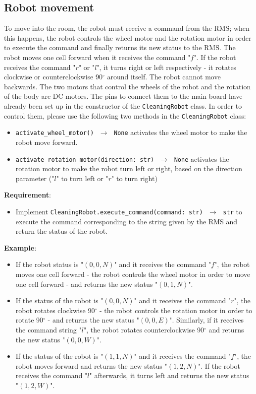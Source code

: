 \subsection{Robot movement}
To move into the room, the robot must receive a command from the RMS; when this happens, the robot controls the wheel motor and the rotation motor in order to execute the command and finally returns its new status to the RMS.
The robot moves one cell forward when it receives the command "$f$". If the robot receives the command "$r$" or "$l$", it turns right or left respectively - \ie it rotates clockwise or counterclockwise 90$^{\circ}$ around itself. The robot cannot move backwards.
The two motors that control the wheels of the robot and the rotation of the body are DC motors. The pins to connect them to the main board have already been set up in the constructor of the \texttt{CleaningRobot} class.
In order to control them, please use the following two methods in the \texttt{CleaningRobot} class:
\begin{itemize}
    \item \texttt{activate\_wheel\_motor() $\,\to\,$ None}  activates the wheel motor to make the robot move forward.
    \item \texttt{activate\_rotation\_motor(direction: str) $\,\to\,$ None} activates the rotation motor to make the robot turn left or right, based on the direction parameter ("$l$" to turn left or "$r$" to turn right)
\end{itemize}

\noindent\textbf{Requirement}:
\begin{itemize}
    \item Implement \texttt{CleaningRobot.execute\_command(command: str) $\,\to\,$ str} to execute the command corresponding to the string given by the RMS and return the status of the robot.
\end{itemize}

\noindent\textbf{Example}:
\begin{itemize}
    \item If the robot status is "$(0,0,N)$" and it receives the command "$f$", the robot moves one cell forward - \ie the robot controls the wheel motor in order to move one cell forward - and returns the new status "$(0,1,N)$". 
    \item If the status of the robot is "$(0,0,N)$" and it receives the command "$r$", the robot rotates clockwise 90$^{\circ}$ - \ie the robot controls the rotation motor in order to rotate 90$^{\circ}$ - and returns the new status "$(0,0,E)$". Similarly, if it receives the command string "$l$", the robot rotates counterclockwise 90$^{\circ}$ and returns the new status "$(0,0,W)$".
    \item If the  status of the robot is "$(1,1,N)$" and it receives the command "$f$", the robot moves forward and returns the new status "$(1,2,N)$". If the robot receives the command "$l$" afterwards, it turns left and returns the new status "$(1,2,W)$".
\end{itemize}

